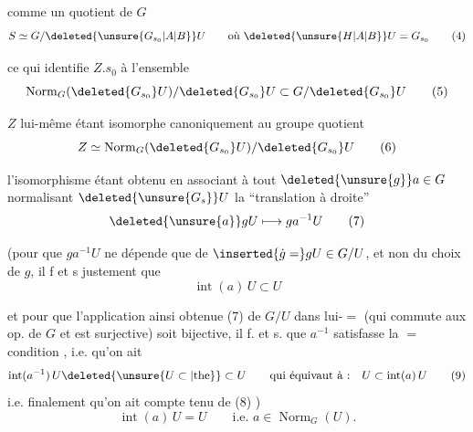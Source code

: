 comme un quotient de $G$
\[
S\simeq G/\deleted{\unsure{G_{s_0}|A|B}}U\qquad\text{où }\deleted{\unsure{H|A|B}}U=G_{s_0}\tag*{(4)}
\]

ce qui identifie $Z.s_0$ à l'ensemble
\[
\operatorname{Norm}_G(\deleted{G_{s_0}}U)/\deleted{G_{s_0}}U\subset G/\deleted{G_{s_0}}U\tag*{(5)}
\]

$Z$ lui-même étant isomorphe canoniquement au groupe quotient
\[
Z\simeq\operatorname{Norm}_G(\deleted{G_{s_0}}U)/\deleted{G_{s_0}}U\tag*{(6)}
\]

l'isomorphisme étant obtenu en associant à tout $\deleted{\unsure{g}}a\in G$ normalisant $\deleted{\unsure{G_s}}U$ la ``translation à droite''
\[
\deleted{\unsure{a}}gU\longmapsto ga^{-1}U\tag*{(7)}
\]

(pour que $ga^{-1}U$ ne dépende que de $\inserted{\dot g=}gU\in G/U$, et non du choix de $g$, il f et s justement que   
\[
\operatorname{int}(a)\,U\subset U\tag*{(8)}
\]

et pour que l'application ainsi obtenue (7) de $G/U$ dans lui-$=$ (qui commute aux op. de $G$ et est surjective) soit bijective, il f. et s. que $a^{-1}$ satisfasse la $=$ condition , i.e. qu'on ait
\[
\operatorname{int}(a^{-1})\,U\deleted{\unsure{U\subset|\text{the}}} \subset U\qquad\text{qui équivaut à :}\quad U\subset\operatorname{int}(a)\,U \tag*{(9)}
\]
i.e. finalement qu'on ait compte tenu de (8) )
\[
\operatorname{int}(a)\,U=U\qquad\text{i.e. }a\in\operatorname{Norm}_G(U).\tag*{(10)}
\]

